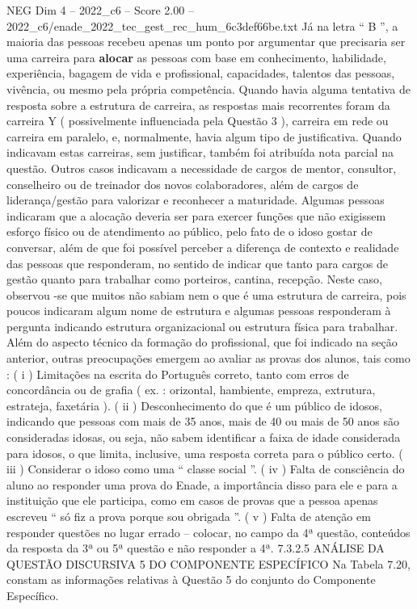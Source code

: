 \begin{textsample}{NEG Dim 4 – 2022\_c6 – Score 2.00 – 2022\_c6/enade\_2022\_tec\_gest\_rec\_hum\_6c3def66be.txt}
Já na letra “ B ”, a maioria das pessoas recebeu apenas um ponto por argumentar que precisaria ser uma carreira para \textbf{alocar} as pessoas com base em conhecimento, habilidade, experiência, bagagem de vida e profissional, capacidades, talentos das pessoas, vivência, ou mesmo pela própria competência.
Quando havia alguma tentativa de resposta sobre a estrutura de carreira, as respostas mais recorrentes foram da carreira Y ( possivelmente influenciada pela Questão 3 ), carreira em rede ou carreira em paralelo, e, normalmente, havia algum tipo de justificativa.
Quando indicavam estas carreiras, sem justificar, também foi atribuída nota parcial na questão.
Outros casos indicavam a necessidade de cargos de mentor, consultor, conselheiro ou de treinador dos novos colaboradores, além de cargos de liderança/gestão para valorizar e reconhecer a maturidade.
Algumas pessoas indicaram que a alocação deveria ser para exercer funções que não exigissem esforço físico ou de atendimento ao público, pelo fato de o idoso gostar de conversar, além de que foi possível perceber a diferença de contexto e realidade das pessoas que responderam, no sentido de indicar que tanto para cargos de gestão quanto para trabalhar como porteiros, cantina, recepção.
Neste caso, observou -se que muitos não sabiam nem o que é uma estrutura de carreira, pois poucos indicaram algum nome de estrutura e algumas pessoas responderam à pergunta indicando estrutura organizacional ou estrutura física para trabalhar.
Além do aspecto técnico da formação do profissional, que foi indicado na seção anterior, outras preocupações emergem ao avaliar as provas dos alunos, tais como : ( i ) Limitações na escrita do Português correto, tanto com erros de concordância ou de grafia ( ex. : orizontal, hambiente, empreza, extrutura, estrateja, faxetária ). ( ii ) Desconhecimento do que é um público de idosos, indicando que pessoas com mais de 35 anos, mais de 40 ou mais de 50 anos são consideradas idosas, ou seja, não sabem identificar a faixa de idade considerada para idosos, o que limita, inclusive, uma resposta correta para o público certo. ( iii ) Considerar o idoso como uma “ classe social ”. ( iv ) Falta de consciência do aluno ao responder uma prova do Enade, a importância disso para ele e para a instituição que ele participa, como em casos de provas que a pessoa apenas escreveu “ só fiz a prova porque sou obrigada ”. ( v ) Falta de atenção em responder questões no lugar errado – colocar, no campo da 4ª questão, conteúdos da resposta da 3ª ou 5ª questão e não responder a 4ª. 7.3.2.5 ANÁLISE DA QUESTÃO DISCURSIVA 5 DO COMPONENTE ESPECÍFICO Na Tabela 7.20, constam as informações relativas à Questão 5 do conjunto do Componente Específico.

\end{textsample}
